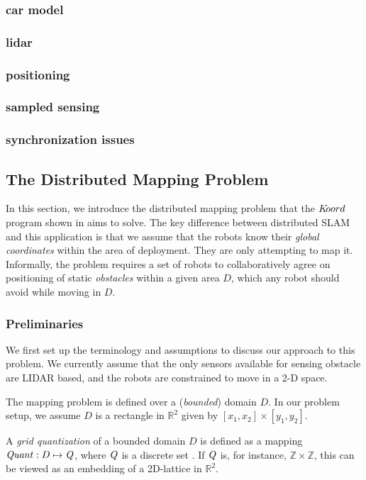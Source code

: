 \subsubsection{car model}
\subsubsection{lidar}
\subsubsection{positioning}
\subsubsection{sampled sensing}
\subsubsection{synchronization issues}
 
\subsection{The Distributed Mapping Problem}
In this section, we introduce the distributed mapping problem that the $K\kern-2pt oord$ program shown in  aims to solve. The key difference between distributed SLAM and this application is that we assume that the robots know their \emph{global coordinates} within the area of deployment. They are only attempting to map it. 
Informally, the problem requires a set of robots to collaboratively agree on positioning of static \emph{obstacles} within a given area $D$, which any robot should avoid while moving in $D$.

\subsubsection{Preliminaries}
We first set up the terminology and assumptions to discuss our approach to this problem. We currently assume that the only sensors available for sensing obstacle are LIDAR based, and the robots are constrained to move in a 2-D space.

The mapping problem is defined over a (\emph{bounded}) domain $D$. In our problem setup, we assume $D$ is a rectangle in $\mathbb{R}^2$ given by $[x_1,x_2]\times [y_1,y_2]$.

\begin{definition}
A \emph{grid quantization} of a bounded domain $D$ is defined as a mapping $\mathit{Quant}:D \mapsto \mathit{Q}$, where $\mathit{Q}$ is a discrete set . If $\mathit{Q}$ is, for instance, $\mathbb{Z}\times \mathbb{Z}$, this can be viewed as an embedding of a 2D-lattice in $\mathbb{R}^2$.  
\end{definition}


